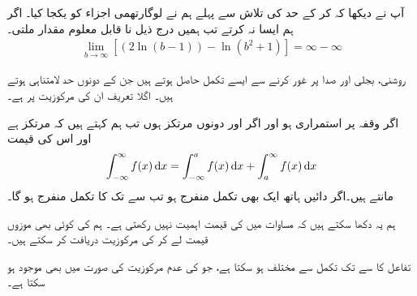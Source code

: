 آپ نے دیکھا کہ  کر کے حد کی تلاش سے پہلے ہم نے لوگارتھمی اجزاء کو یکجا کیا۔ اگر ہم ایسا نہ کرتے تب ہمیں درج ذیل نا قابل معلوم مقدار ملتی۔
\begin{align*}
\lim_{b\to \infty} [(2\ln(b-1))-\ln(b^2+1)]=\infty-\infty
\end{align*} 

روشنی، بجلی اور  صدا پر غور کرنے سے ایسے تکمل حاصل ہوتے ہیں جن کے دونوں حد لامتناہی ہوتے ہیں۔ اگلا تعریف ان کی مرکوزیت پر ہے۔

اگر وقفہ  پر  استمراری ہو اور اگر  اور  دونوں مرتکز ہوں تب ہم کہتے ہیں کہ  مرتکز ہے اور اس کی قیمت 
\begin{align}\label{مساوات_طریقہ_لامتناہی_حدود_کا_تکمل}
\int_{-\infty}^{\infty}f(x)\dif x=\int_{-\infty}^af(x)\dif x+\int_a^{\infty}f(x)\dif x
\end{align}
مانتے ہیں۔اگر دائیں ہاتھ ایک بھی تکمل منفرج ہو تب  سے  تک  کا تکمل منفرج ہو گا۔

ہم یہ دکھا سکتے ہیں کہ مساوات  میں  کی قیمت اہمیت نہیں رکھتی ہے۔ ہم  کی کوئی بھی موزوں قیمت لے کر   کی مرکوزیت دریافت کر سکتے ہیں۔

تفاعل  کا  سے  تک تکمل  سے مختلف ہو سکتا ہے، جو  کی عدم مرکوزیت کی صورت میں بھی موجود ہو سکتا ہے۔

